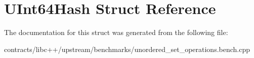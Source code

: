\hypertarget{struct_u_int64_hash}{}\section{U\+Int64\+Hash Struct Reference}
\label{struct_u_int64_hash}


The documentation for this struct was generated from the following file\+:\begin{DoxyCompactItemize}
\item 
contracts/libc++/upstream/benchmarks/unordered\+\_\+set\+\_\+operations.\+bench.\+cpp\end{DoxyCompactItemize}
